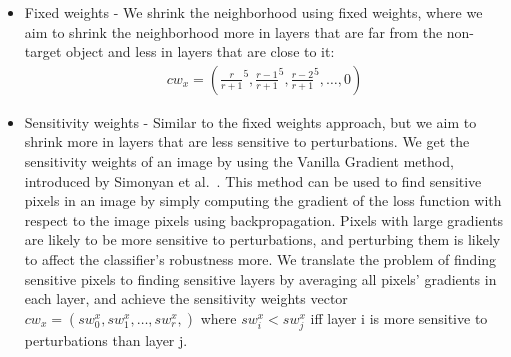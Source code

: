     \begin{itemize}
        \item Fixed weights - We shrink the neighborhood using fixed weights, where we aim to shrink the neighborhood more in layers that are far from the non-target object and less in layers that are close to it:
        \begin{gather*}
            cw_x = ({\frac{r}{r+1}}^5, {\frac{r-1}{r+1}}^5, {\frac{r-2}{r+1}}^5, \ldots, 0)
        \end{gather*}
        \item Sensitivity weights - Similar to the fixed weights approach, but we aim to shrink more in layers that are less sensitive to perturbations.
        We get the sensitivity weights of an image by using the Vanilla Gradient method, introduced by Simonyan et al.~\cite{VANILLAGRADIENT}.
        This method can be used to find sensitive pixels in an image by simply computing the gradient of the loss function with respect to the image pixels using backpropagation.
        Pixels with large gradients are likely to be more sensitive to perturbations, and perturbing them is likely to affect the classifier's robustness more.
        We translate the problem of finding sensitive pixels to finding sensitive layers by averaging all pixels' gradients in each layer, and achieve the sensitivity weights vector
        $cw_x = (sw_0^x, sw_1^x, \ldots, sw_r^x,)$
        where $sw_i^x < sw_j^x$ iff layer i is more sensitive to perturbations than layer j.
    \end{itemize}

